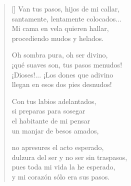 



\settowidth{\versewidth}{Me llegan en esos dos pies contenidos!}

\bigskip

\begin{verse}[\versewidth]
  Van tus pasos, hijos de mi callar, \\
  santamente, lentamente colocados... \\
  Mi cama en vela quieren hallar, \\
  procediendo mudos y helados.

  Oh sombra pura, oh ser divino, \\
  ¡qué suaves son, tus pasos menudos! \\
  ¡Dioses!... ¡Los dones que adivino \\
  llegan en esos dos pies desnudos!

  Con tus labios adelantados, \\
  si preparas para sosegar  \\
  el habitante de mi pensar \\
  un manjar de besos amados,

  no apresures el acto esperado, \\
  dulzura del ser y no ser sin traspasos, \\
  pues toda mi vida la he esperado, \\
  y mi corazón sólo era sus pasos.
\end{verse}

\newpage



\settowidth{\versewidth}{Dieux!... tous les dons que je devine}

\bigskip

